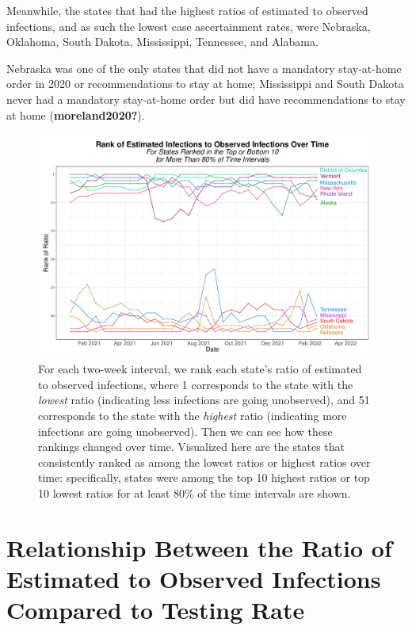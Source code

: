\documentclass[12pt,twoside]{smiththesis}
\begin{document}
Meanwhile, the states that had the highest ratios of estimated to observed infections, and as such the lowest case ascertainment rates, were Nebraska, Oklahoma, South Dakota, Mississippi, Tennessee, and Alabama.

Nebraska was one of the only states that did not have a mandatory stay-at-home order in 2020 or recommendations to stay at home; Mississippi and South Dakota never had a mandatory stay-at-home order but did have recommendations to stay at home (\textbf{moreland2020?}).
\begin{figure}
\includegraphics[width=1\linewidth]{figure/rank-ratio-over-time} \caption{\label{fig:rank-ratio-over-time}For each two-week interval, we rank each state's ratio of estimated to observed infections, where 1 corresponds to the state with the \emph{lowest} ratio (indicating less infections are going unobserved), and 51 corresponds to the state with the \emph{highest} ratio (indicating more infections are going unobserved). Then we can see how these rankings changed over time. Visualized here are the states that consistently ranked as among the lowest ratios or highest ratios over time: specifically, states were among the top 10 highest ratios or top 10 lowest ratios for at least 80\% of the time intervals are shown.}\label{fig:unnamed-chunk-15}
\end{figure}
\hypertarget{relationship-between-the-ratio-of-estimated-to-observed-infections-compared-to-testing-rate}{%
\section{Relationship Between the Ratio of Estimated to Observed Infections Compared to Testing Rate}\label{relationship-between-the-ratio-of-estimated-to-observed-infections-compared-to-testing-rate}}
\end{document}
